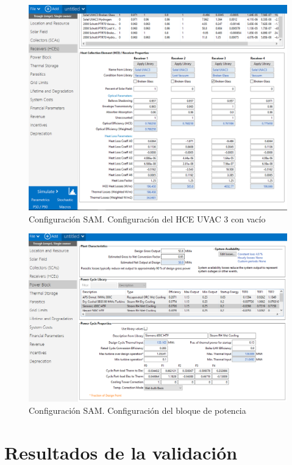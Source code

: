 \documentclass[12pt]{report} %
\begin{document}
\begin{figure}
\includegraphics[scale=0.8]{images/captura_sam03.png}
\caption{Configuración SAM. Configuración del HCE UVAC 3 con vacío}
\label{fig:captura03}
\end{figure}

\begin{figure}
\includegraphics[scale=0.8]{images/captura_sam04.png}
\caption{Configuración SAM. Configuración del bloque de potencia} 
\label{fig:captura04}
\end{figure}

\section{Resultados de la validación}
 
\end{document}
